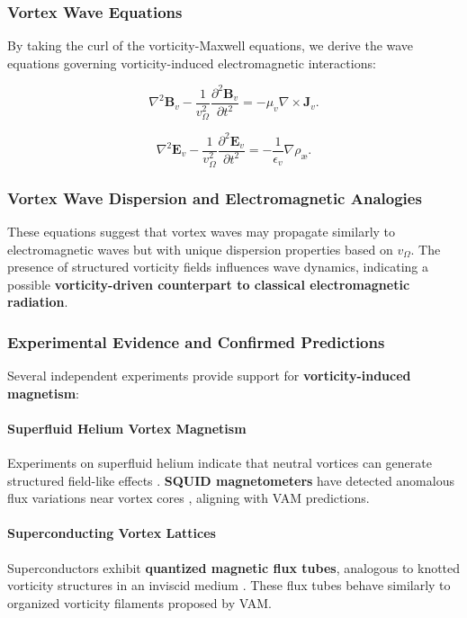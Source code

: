 \subsubsection*{Vortex Wave Equations}
By taking the curl of the vorticity-Maxwell equations, we derive the wave equations governing vorticity-induced electromagnetic interactions:

\begin{equation*}
    \nabla^2 \boldsymbol{B}_v - \frac{1}{v_\Omega^2} \frac{\partial^2 \boldsymbol{B}_v}{\partial t^2} = -\mu_v \nabla \times \boldsymbol{J}_v.
\end{equation*}

\begin{equation*}
    \nabla^2 \boldsymbol{E}_v - \frac{1}{v_\Omega^2} \frac{\partial^2 \boldsymbol{E}_v}{\partial t^2} = -\frac{1}{\epsilon_v} \nabla \rho_\text{æ}.
\end{equation*}

\subsubsection*{Vortex Wave Dispersion and Electromagnetic Analogies}
These equations suggest that vortex waves may propagate similarly to electromagnetic waves but with unique dispersion properties based on \( v_\Omega \). The presence of structured vorticity fields influences wave dynamics, indicating a possible \textbf{vorticity-driven counterpart to classical electromagnetic radiation}.

\subsubsection*{Experimental Evidence and Confirmed Predictions}
Several independent experiments provide support for \textbf{vorticity-induced magnetism}:

\paragraph{Superfluid Helium Vortex Magnetism}
Experiments on superfluid helium indicate that neutral vortices can generate structured field-like effects \cite{superfluid_he_interferometers}. \textbf{SQUID magnetometers} have detected anomalous flux variations near vortex cores \cite{initial_vortex_magnetometers}, aligning with VAM predictions.

\paragraph{Superconducting Vortex Lattices}
Superconductors exhibit \textbf{quantized magnetic flux tubes}, analogous to knotted vorticity structures in an inviscid medium \cite{superconducting_flux_focusing}. These flux tubes behave similarly to organized vorticity filaments proposed by VAM.

